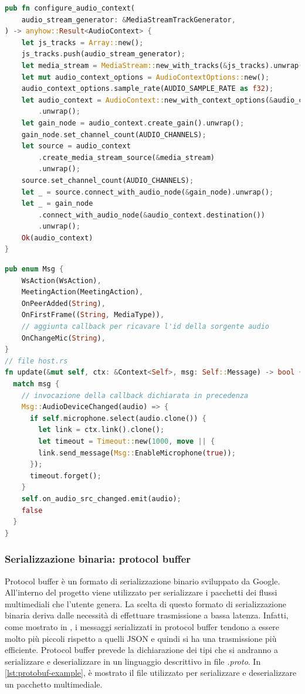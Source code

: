 \documentclass{article}
\begin{document}
\begin{lstlisting}[language=Rust, style=boxed, label={lst:decoder-params}, captionpos=b,caption={Configurazione audio stereo per il decoder OPUS}]
pub fn configure_audio_context(
    audio_stream_generator: &MediaStreamTrackGenerator,
) -> anyhow::Result<AudioContext> {
    let js_tracks = Array::new();
    js_tracks.push(audio_stream_generator);
    let media_stream = MediaStream::new_with_tracks(&js_tracks).unwrap();
    let mut audio_context_options = AudioContextOptions::new();
    audio_context_options.sample_rate(AUDIO_SAMPLE_RATE as f32);
    let audio_context = AudioContext::new_with_context_options(&audio_context_options)
        .unwrap();
    let gain_node = audio_context.create_gain().unwrap();
    gain_node.set_channel_count(AUDIO_CHANNELS);
    let source = audio_context
        .create_media_stream_source(&media_stream)
        .unwrap();
    source.set_channel_count(AUDIO_CHANNELS);
    let _ = source.connect_with_audio_node(&gain_node).unwrap();
    let _ = gain_node
        .connect_with_audio_node(&audio_context.destination())
        .unwrap();
    Ok(audio_context)
}

\end{lstlisting}

\begin{lstlisting}[language=Rust, style=boxed, label={lst:callback-audio-id}, captionpos=b,caption={Modifica del file host.rs per invocare la callback}]
pub enum Msg {
    WsAction(WsAction),
    MeetingAction(MeetingAction),
    OnPeerAdded(String),
    OnFirstFrame((String, MediaType)),
    // aggiunta callback per ricavare l'id della sorgente audio
    OnChangeMic(String),
}
// file host.rs
fn update(&mut self, ctx: &Context<Self>, msg: Self::Message) -> bool {
  match msg {
    // invocazione della callback dichiarata in precedenza
    Msg::AudioDeviceChanged(audio) => {
      if self.microphone.select(audio.clone()) {
        let link = ctx.link().clone();
        let timeout = Timeout::new(1000, move || {
        link.send_message(Msg::EnableMicrophone(true));
      });
      timeout.forget();
    }
    self.on_audio_src_changed.emit(audio);
    false
  }
}
\end{lstlisting}

\subsubsection{Serializzazione binaria: protocol buffer} 
Protocol buffer \cite{ProtcolBuffer} è un formato di serializzazione binario sviluppato da Google. All'interno 
del progetto viene utilizzato per serializzare i pacchetti dei flussi multimediali che 
l'utente genera. La scelta di questo formato di serializzazione binaria deriva dalle necessità 
di effettuare trasmissione a bassa latenza. Infatti, come mostrato in \cite{popic2016performance},
i messaggi serializzati in protocol buffer tendono a essere molto più piccoli rispetto a quelli
JSON e quindi si ha una trasmissione più efficiente. Protocol buffer prevede la dichiarazione dei tipi
che si andranno a serializzare e deserializzare in un linguaggio descrittivo in file \textit{.proto}. 
In \cref{lst:protobuf-example}, è mostrato il file utilizzato per serializzare e 
deserializzare un pacchetto multimediale.
\end{document}
